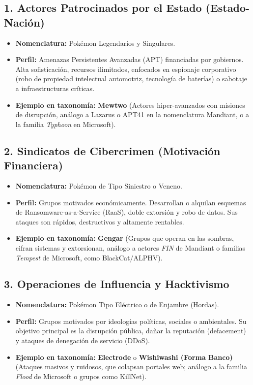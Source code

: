 \documentclass[letterpaper,11pt]{article}
\begin{document}
\subsection{1. Actores Patrocinados por el Estado (Estado-Nación)}
\begin{itemize}
    \item \textbf{Nomenclatura:} Pokémon Legendarios y Singulares.
    \item \textbf{Perfil:} Amenazas Persistentes Avanzadas (APT) financiadas por gobiernos. Alta sofisticación, recursos ilimitados, enfocados en espionaje corporativo (robo de propiedad intelectual automotriz, tecnología de baterías) o sabotaje a infraestructuras críticas.
    \item \textbf{Ejemplo en taxonomía:} \textbf{Mewtwo} (Actores hiper-avanzados con misiones de disrupción, análogo a Lazarus o APT41 en la nomenclatura Mandiant, o a la familia \textit{Typhoon} en Microsoft).
\end{itemize}

\subsection{2. Sindicatos de Cibercrimen (Motivación Financiera)}
\begin{itemize}
    \item \textbf{Nomenclatura:} Pokémon de Tipo Siniestro o Veneno.
    \item \textbf{Perfil:} Grupos motivados económicamente. Desarrollan o alquilan esquemas de Ransomware-as-a-Service (RaaS), doble extorsión y robo de datos. Sus ataques son rápidos, destructivos y altamente rentables.
    \item \textbf{Ejemplo en taxonomía:} \textbf{Gengar} (Grupos que operan en las sombras, cifran sistemas y extorsionan, análogo a actores \textit{FIN} de Mandiant o familias \textit{Tempest} de Microsoft, como BlackCat/ALPHV).
\end{itemize}

\subsection{3. Operaciones de Influencia y Hacktivismo}
\begin{itemize}
    \item \textbf{Nomenclatura:} Pokémon Tipo Eléctrico o de Enjambre (Hordas).
    \item \textbf{Perfil:} Grupos motivados por ideologías políticas, sociales o ambientales. Su objetivo principal es la disrupción pública, dañar la reputación (defacement) y ataques de denegación de servicio (DDoS).
    \item \textbf{Ejemplo en taxonomía:} \textbf{Electrode} o \textbf{Wishiwashi (Forma Banco)} (Ataques masivos y ruidosos, que colapsan portales web; análogo a la familia \textit{Flood} de Microsoft o grupos como KillNet).
\end{itemize}
\end{document}
